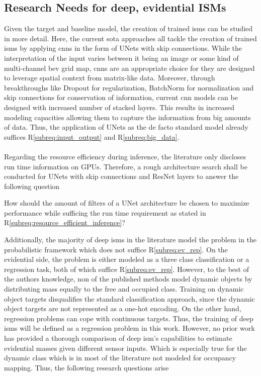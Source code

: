 \subsection{Research Needs for deep, evidential ISMs}
\label{subsec:research_needs_for_deep_isms}
Given the target and baseline model, the creation of trained \gls{ism}s can be studied in more detail. Here, the current \gls{sota} approaches all tackle the creation of trained \gls{ism}s by applying \gls{cnn}s in the form of UNets with skip connections. While the interpretation of the input varies between it being an image or some kind of multi-channel \gls{bev} grid map, \gls{cnn}s are an appropriate choice for they are designed to leverage spatial context from matrix-like data. Moreover, through breakthroughs like Dropout for regularization, BatchNorm for normalization and skip connections for conservation of information, current \gls{cnn} models can be designed with increased number of stacked layers. This results in increased modeling capacities allowing them to capture the information from big amounts of data. Thus, the application of UNets as the de facto standard model already suffices R\ref{subreq:input_output} and R\ref{subreq:big_data}.
\\\\
Regarding the resource efficiency during inference, the literature only discloses run time information on GPUs. Therefore, a rough architecture search shall be conducted for UNets with skip connections and ResNet layers to answer the following question
\\
\begin{requ} \label{requ:network_search}
	How should the amount of filters of a UNet architecture be chosen to maximize performance while sufficing the run time requirement as stated in R\ref{subreq:resource_efficient_inference}?
\end{requ}
Additionally, the majority of deep \gls{ism}s in the literature model the problem in the probabilistic framework which does not suffice R\ref{subreq:ev_rep}. On the evidential side, the problem is either modeled as a three class classification or a regression task, both of which suffice R\ref{subreq:ev_rep}. However, to the best of the authors knowledge, non of the published methods model dynamic objects by distributing mass equally to the free and occupied class. Training on dynamic object targets disqualifies the standard classification approach, since the dynamic object targets are not represented as a one-hot encoding. On the other hand, regression problems can cope with continuous targets. Thus, the training of deep \gls{ism}s will be defined as a regression problem in this work. However, no prior work has provided a thorough comparison of deep \gls{ism}'s capabilities to estimate evidential masses given different sensor inputs. Which is especially true for the dynamic class which is in most of the literature not modeled for occupancy mapping. Thus, the following research questions arise
